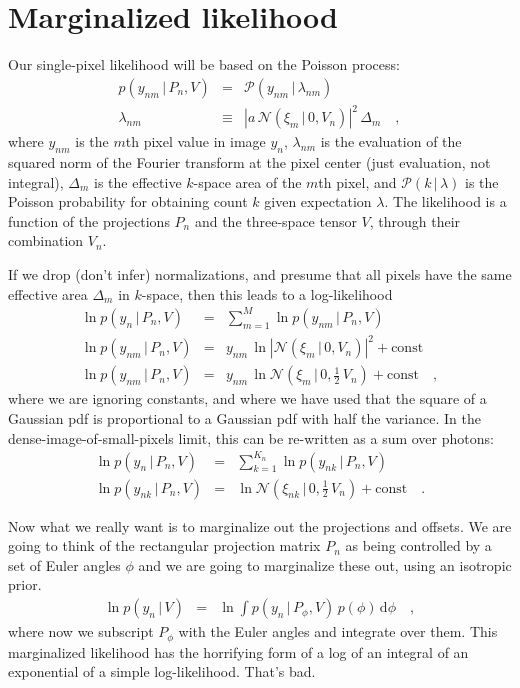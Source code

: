 \documentclass[12pt]{article}
\newcommand{\normal}{\mathscr{N}}
\newcommand{\Poisson}{\mathscr{P}}
\newcommand{\sqnorm}[1]{|{#1}|^2}
\newcommand{\given}{\,|\,}
\newcommand{\dd}{\mathrm{d}}
\begin{document}
\section{Marginalized likelihood}

Our single-pixel likelihood will be based on the Poisson process:
\begin{eqnarray}
  p(y_{nm}\given P_n,V) &=& \Poisson(y_{nm}\given\lambda_{nm})
  \\
  \lambda_{nm} &\equiv& \sqnorm{a\,\normal(\xi_m\given 0,V_n)}\,\Delta_m
  \quad,
\end{eqnarray}
where $y_{nm}$ is the $m$th pixel value in image $y_n$,
$\lambda_{nm}$ is the evaluation of the squared norm of the Fourier
transform at the pixel center (just evaluation, not integral),
$\Delta_m$ is the effective $k$-space area of the $m$th pixel,
and $\Poisson(k\given\lambda)$ is the Poisson probability for obtaining
count $k$ given expectation $\lambda$.
The likelihood is a function of the projections $P_n$ and the
three-space tensor $V$, through their combination $V_n$.

If we drop (don't infer) normalizations, and presume that all pixels
have the same effective area $\Delta_m$ in $k$-space, then this leads
to a log-likelihood
\begin{eqnarray}
  \ln p(y_n\given P_n,V) &=& \sum_{m=1}^M \ln p(y_{nm}\given P_n,V)
  \\
  \ln p(y_{nm}\given P_n,V) &=& y_{nm}\,\ln\sqnorm{\normal(\xi_m\given 0,V_n)} + \mbox{const}
  \\
  \ln p(y_{nm}\given P_n,V) &=& y_{nm}\,\ln\normal(\xi_m\given 0,\frac{1}{2}\,V_n) + \mbox{const}
  \quad,
\end{eqnarray}
where we are ignoring constants, and where we have used that the square
of a Gaussian pdf is proportional to a Gaussian pdf with half the variance.
In the dense-image-of-small-pixels limit, this can be re-written as a
sum over photons:
\begin{eqnarray}
  \ln p(y_n\given P_n,V) &=& \sum_{k=1}^{K_n} \ln p(y_{nk}\given P_n,V)
  \\
  \ln p(y_{nk}\given P_n,V) &=& \ln\normal(\xi_{nk}\given 0,\frac{1}{2}\,V_n) + \mbox{const}
  \quad.
\end{eqnarray}

Now what we really want is to marginalize out the projections and
offsets.
We are going to think of the rectangular projection matrix $P_n$ as
being controlled by a set of Euler angles $\phi$ and we are going to
marginalize these out, using an isotropic prior.
\begin{eqnarray}
  \ln p(y_n\given V) &=& \ln\int p(y_n\given P_{\phi},V)\,p(\phi)\,\dd\phi
  \quad,
\end{eqnarray}
where now we subscript $P_{\phi}$ with the Euler angles and integrate
over them.
This marginalized likelihood has the horrifying form of a log of an
integral of an exponential of a simple log-likelihood.  That's bad.
\end{document}
